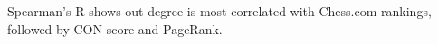 \documentclass[preview]{standalone}
\begin{document}
Spearman's R shows out-degree is most correlated with Chess.com rankings, followed by CON score and PageRank.\\
\end{document}
